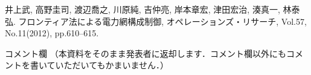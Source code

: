 \documentclass[a4j,10pt,dvipdfmx]{jarticle}
\begin{document}
\begin{multicols}{1}



%  

\begin{thebibliography}{10}
\small
\setlength{\itemsep}{-2pt} %
  井上武, 高野圭司, 渡辺喬之, 川原純, 吉仲亮, 岸本章宏, 津田宏治, 湊真一, 林泰弘.
  フロンティア法による電力網構成制御,
  オペレーションズ・リサーチ, Vol.57, No.11(2012), pp.610--615.
\end{thebibliography}

\end{multicols}
\vfill
\noindent
{\gt コメント欄}
{\footnotesize
（本資料をそのまま発表者に返却します．コメント欄以外にもコメントを書いていただいてもかまいません．）}
\\
\fbox{\begin{minipage}{\textwidth}\noindent\\\\\end{minipage}}	
\end{document}
